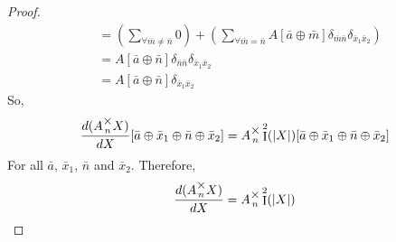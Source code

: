 \documentclass[12pt]{book}
\theoremstyle{plain}
\theoremstyle{definition}
\theoremstyle{ppart}
\theoremstyle{case}
\theoremstyle{solution}
\DeclareMathOperator{\Ident}{I}
\newcommand{\mmult}[1]{\text{\raisebox{1ex}{$\underset{#1}{\times}$}}}
\begin{document}
\begin{proof}
\begin{align*}
  &=
  \left(
    \sum_{\forall \bar{m} \ne \bar{n}} 0
  \right)
  +
  \left(
    \sum_{\forall \bar{m} = \bar{n}}
    A[\bar{a} \oplus \bar{m}]
    \delta_{\bar{m} \bar{n}}
    \delta_{\bar{x}_1 \bar{x}_2}
  \right) \\
  &=
  A[\bar{a} \oplus \bar{n}]
  \delta_{\bar{n} \bar{n}}
  \delta_{\bar{x}_1 \bar{x}_2} \\
  &=
  A[\bar{a} \oplus \bar{n}]
  \delta_{\bar{x}_1 \bar{x}_2}
\end{align*}
So, 
\[
  \frac{d(A\mmult{n}X)}{dX}[\bar{a} \oplus \bar{x}_1 \oplus \bar{n} \oplus \bar{x}_2]
  =
  A \mmult{n} \Ident^2(|X|)[\bar{a} \oplus \bar{x}_1 \oplus \bar{n} \oplus \bar{x}_2]
\]
For all $\bar{a}$, $\bar{x}_1$, $\bar{n}$ and $\bar{x}_2$. Therefore,
\[
  \frac{d(A\mmult{n}X)}{dX}
  =
  A \mmult{n} \Ident^2(|X|)
\]
\end{proof}
\end{document}
